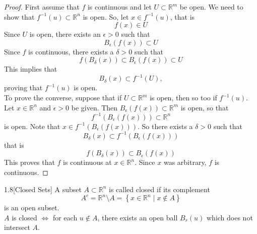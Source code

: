 \begin{proof}
First assume that $f$ is continuous and let $U \subset \mathbb{R}^m$ be open. We need to show that $f^{-1}(u) \subset \mathbb{R}^n$ is open. So, let $x \in f^{-1}(u)$, that is 
$$f(x) \in U$$
Since $U$ is open, there exists an $\epsilon > 0$ such that 
$$B_\epsilon(f(x)) \subset U$$
Since $f$ is continuous, there exists a $\delta > 0$ such that 
$$f(B_\delta(x))\subset B_\epsilon(f(x)) \subset U$$
This implies that 
$$B_\delta (x) \subset f^{-1}(U),$$
proving that $f^{-1}(u)$ is open.\\
To prove the converse, suppose that if $U \subset \mathbb{R}^m$ is open, then so too if $f^{-1} (u)$. Let $x \in \mathbb{R}^n$ and $\epsilon > 0$ be given. Then $B_\epsilon(f(x)) \subset \mathbb{R}^m$ is open, so that
$$f^{-1}\left(B_\epsilon(f(x))\right) \subset \mathbb{R}^n$$
is open. Note that $x\in f^{-1}\left(B_\epsilon(f(x))\right)$. So there exists a $\delta > 0$ such that 
$$B_\delta(x) \subset f^{-1} (B_\epsilon (f(x)))$$
that is
$$f(B_\delta(x)) \subset B_\epsilon(f(x))$$
This proves that $f$ is continuous at $x\in\mathbb{R}^n$. Since $x$ was arbitrary, $f$ is continuous.
\end{proof}

\begin{customdefinition}{1.8}[Closed Sets] A subset $A \subset \mathbb{R}^n$ is called closed if its complement
$$A^c = \mathbb{R}^n \setminus A =\left\{x \in \mathbb{R}^n \mid x \notin A\right\}$$
is an open subset.\\
$A$ is closed $\iff$ for each $u\notin A$, there exists an open ball $B_r(u)$ which does not intersect $A$.
\end{customdefinition}
